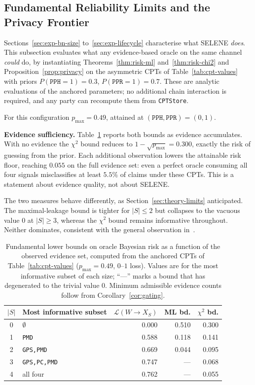 \documentclass[journal]{IEEEtran}
\theoremstyle{definition}
\theoremstyle{remark}
\begin{document}
\subsection{Fundamental Reliability Limits and the
Privacy Frontier}
\label{sec:exp-risk}

Sections~\ref{sec:exp-bn-size} to~\ref{sec:exp-lifecycle}
characterise what SELENE \emph{does}. This subsection
evaluates what any evidence-based oracle on the same
channel \emph{could} do, by instantiating
Theorems~\ref{thm:risk-ml} and~\ref{thm:risk-chi2} and
Proposition~\ref{prop:privacy} on the asymmetric CPTs of
Table~\ref{tab:cpt-values} with priors
$P(\texttt{PPH}{=}1)=0.3$, $P(\texttt{PPR}{=}1)=0.7$.
These are analytic evaluations of the anchored parameters;
no additional chain interaction is required, and any party
can recompute them from \texttt{CPTStore}.

For this configuration $p_{\max}=0.49$, attained at
$(\texttt{PPH},\texttt{PPR})=(0,1)$.

\textbf{Evidence sufficiency.}
Table~\ref{tab:risk-bounds} reports both bounds as
evidence accumulates.
With no evidence the $\chi^2$ bound reduces to
$1-\sqrt{p_{\max}}=0.300$, exactly the risk of guessing
from the prior. Each additional observation lowers the
attainable risk floor, reaching $0.055$ on the full
evidence set: even a perfect oracle consuming all four
signals misclassifies at least $5.5\%$ of claims under
these CPTs. This is a statement about evidence quality,
not about SELENE.

The two measures behave differently, as
Section~\ref{sec:theory-limits} anticipated. The
maximal-leakage bound is tighter for $|S|\le2$ but
collapses to the vacuous value $0$ at $|S|\ge3$, whereas
the $\chi^2$ bound remains informative throughout. Neither
dominates, consistent with the general observation
in~\cite{esposito2024lower}.

\begin{table}[t]
\centering
\caption{Fundamental lower bounds on oracle Bayesian risk
as a function of the observed evidence set, computed from
the anchored CPTs of Table~\ref{tab:cpt-values}
($p_{\max}=0.49$, $0$--$1$ loss). Values are for the most
informative subset of each size; ``---'' marks a bound that
has degenerated to the trivial value $0$. Minimum
admissible evidence counts follow from
Corollary~\ref{cor:gating}.}
\label{tab:risk-bounds}
\begin{tabularx}{\columnwidth}{cXrrr}
\toprule
$|S|$ &
\textbf{Most informative subset} &
$\mathcal{L}(W{\to}X_S)$ &
\textbf{ML bd.} &
$\chi^2$ \textbf{bd.} \\
\midrule
0 & $\emptyset$              & 0.000 & 0.510 & 0.300 \\
1 & \texttt{PMD}             & 0.588 & 0.118 & 0.141 \\
2 & \texttt{GPS,PMD}         & 0.669 & 0.044 & 0.095 \\
3 & \texttt{GPS,PC,PMD}      & 0.747 & ---   & 0.068 \\
4 & all four                 & 0.762 & ---   & 0.055 \\
\bottomrule
\end{tabularx}
\end{table}
\end{document}
